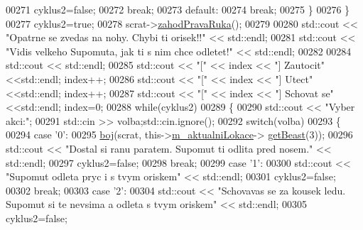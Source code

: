 \begin{DoxyCode}
00271                     cyklus2=\textcolor{keyword}{false};
00272                     \textcolor{keywordflow}{break};
00273                 \textcolor{keywordflow}{default}:
00274                     \textcolor{keywordflow}{break};
00275             \}
00276     \}
00277     cyklus2=\textcolor{keyword}{true};
00278     scrat->\hyperlink{classIceAge_1_1ObleceneVybaveniVeverky_ac24580a8bfcf97220c1967f58111c8f1}{zahodPravaRuka}();
00279 
00280     std::cout << \textcolor{stringliteral}{"Opatrne se zvedas na nohy. Chybi ti orisek!!"} << std::endl;
00281     std::cout << \textcolor{stringliteral}{"Vidis velkeho Supomuta, jak ti s nim chce odletet!"} << std::endl;
00282 
00284     std::cout << std::endl;
00285     std::cout << \textcolor{stringliteral}{"["} << index << \textcolor{stringliteral}{"] Zautocit"} <<std::endl; index++;
00286     std::cout << \textcolor{stringliteral}{"["} << index << \textcolor{stringliteral}{"] Utect"} <<std::endl; index++;
00287     std::cout << \textcolor{stringliteral}{"["} << index << \textcolor{stringliteral}{"] Schovat se"} <<std::endl; index=0;
00288     \textcolor{keywordflow}{while}(cyklus2)
00289     \{
00290             std::cout << \textcolor{stringliteral}{"Vyber akci:"};
00291             std::cin >> volba;std::cin.ignore();
00292             \textcolor{keywordflow}{switch}(volba)
00293             \{
00294                 \textcolor{keywordflow}{case} \textcolor{charliteral}{'0'}:
00295                     \hyperlink{namespaceIceAge_a2c6b97286bcd54e3ecf2fdc335460e90}{boj}(scrat, this->\hyperlink{classIceAge_1_1Hra_a2d006812c29f093c47054be30c8b7591}{m\_aktualniLokace}->
      \hyperlink{classIceAge_1_1Lokace_a8aa0d127082ec0f09968909bb51341fd}{getBeast}(3));
00296                     std::cout << \textcolor{stringliteral}{"Dostal si ranu paratem. Supomut ti odlita pred nosem."} << std::endl;
00297                     cyklus2=\textcolor{keyword}{false};
00298                     \textcolor{keywordflow}{break};
00299                 \textcolor{keywordflow}{case} \textcolor{charliteral}{'1'}:
00300                     std::cout << \textcolor{stringliteral}{"Supomut odleta pryc i s tvym oriskem"} << std::endl;
00301                     cyklus2=\textcolor{keyword}{false};
00302                     \textcolor{keywordflow}{break};
00303                 \textcolor{keywordflow}{case} \textcolor{charliteral}{'2'}:
00304                     std::cout << \textcolor{stringliteral}{"Schovavas se za kousek ledu. Supomut si te nevsima a odleta s tvym
       oriskem"} << std::endl;
00305                     cyklus2=\textcolor{keyword}{false};

\end{DoxyCode}
